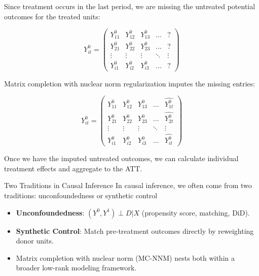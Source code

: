 \documentclass{beamer}
\begin{document}
\begin{frame}[plain]
\small
Since treatment occurs in the last period, we are missing the untreated potential outcomes for the treated units:

\begin{center}
\[
Y^0_{it} = \begin{pmatrix}
Y^0_{11} & Y^0_{12} & Y^0_{13} & \dots & ? \\
Y^0_{21} & Y^0_{22} & Y^0_{23} & \dots & ? \\
\vdots & \vdots & \vdots & \ddots & \vdots \\
Y^0_{i1} & Y^0_{i2} & Y^0_{i3} & \dots & ?
\end{pmatrix}
\]
\end{center}

\end{frame}




\begin{frame}[plain]
\small
Matrix completion with nuclear norm regularization imputes the missing entries:

\begin{center}
\[
Y^0_{it} = \begin{pmatrix}
Y^0_{11} & Y^0_{12} & Y^0_{13} & \dots & \widehat{Y^0_{1t}} \\
Y^0_{21} & Y^0_{22} & Y^0_{23} & \dots & \widehat{Y^0_{2t}} \\
\vdots & \vdots & \vdots & \ddots & \vdots \\
Y^0_{i1} & Y^0_{i2} & Y^0_{i3} & \dots & \widehat{Y^0_{it}}
\end{pmatrix}
\]
\end{center}

Once we have the imputed untreated outcomes, we can calculate individual treatment effects and aggregate to the ATT.
\end{frame}





\begin{frame}{Two Traditions in Causal Inference}
\small
 In causal inference, we often come from two traditions: unconfoundedness or synthetic control

\begin{itemize}
  \item \textbf{Unconfoundedness}: $(Y^0, Y^1) \perp D | X$ (propensity score, matching, DiD).
  \item \textbf{Synthetic Control}: Match pre-treatment outcomes directly by reweighting donor units.
  \item Matrix completion with nuclear norm (MC-NNM) nests both within a broader low-rank modeling framework.
\end{itemize}
\end{frame}
\end{document}
